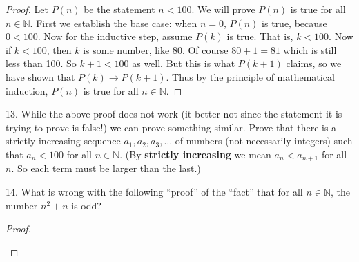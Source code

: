 \documentclass[10pt,]{book}
\newcommand{\terminology}[1]{\textbf{#1}}
\theoremstyle{plain}
\theoremstyle{definition}
\numberwithin{equation}{chapter}
\def\N{\mathbb N}
\def\imp{\rightarrow}
\newcommand{\lt}{ < }
\begin{document}
\begin{exerciselist}
\begin{proof}
            Let \(P(n)\) be the statement \(n \lt  100\). We will prove \(P(n)\) is true for all \(n \in \N\). First we establish the base case: when \(n = 0\), \(P(n)\) is true, because \(0 \lt  100\). Now for the inductive step, assume \(P(k)\) is true. That is, \(k \lt  100\). Now if \(k \lt  100\), then \(k\) is some number, like 80. Of course \(80+1 = 81\) which is still less than 100. So \(k +1 \lt  100\) as well. But this is what \(P(k+1)\) claims, so we have shown that \(P(k) \imp P(k+1)\). Thus by the principle of mathematical induction, \(P(n)\) is true for all \(n \in \N\).
\end{proof}
\par\smallskip
\item[13.]\hypertarget{exercise-196}{}
          While the above proof does not work (it better not since the statement it is trying to prove is false!) we can prove something similar. Prove that there is a strictly increasing sequence \(a_1, a_2, a_3, \ldots\) of numbers (not necessarily integers) such that \(a_n \lt  100\) for all \(n \in \N\). (By \terminology{strictly increasing} we mean \(a_n \lt  a_{n+1}\) for all \(n\). So each term must be larger than the last.)
\par\smallskip
\item[14.]\hypertarget{exercise-197}{}
          What is wrong with the following ``proof'' of the ``fact'' that for all \(n \in \N\), the number \(n^2 + n\) is odd?
\begin{proof}\hypertarget{proof-17}{}


\end{proof}
\end{exerciselist}
\end{document}
